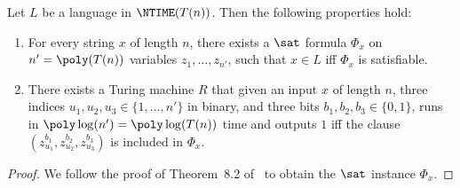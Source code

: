 \begin{theorem}\label{thm:cook-levin}
  Let $L$ be a language in $\NTIME(T(n))$. Then the following
  properties hold:
  \begin{enumerate}
  \item For every string $x$ of length $n$, there exists a $\sat$
    formula $\Phi_x$ on $n' = \poly(T(n))$ variables $z_1, \dots, z_{n'}$, such that $x \in L$ iff
    $\Phi_x$ is satisfiable.
    \item There exists a Turing
      machine $R$ that given an input $x$ of
      length $n$, three indices $u_1, u_2, u_3 \in \{1, \dots, n'\}$ in
      binary, and three bits $b_1, b_2, b_3 \in \{0,1\}$, runs in
      $\poly\log(n') = \poly\log(T(n))$ time and outputs $1$ iff the clause
      $(z_{u_1}^{b_1}, z_{u_2}^{b_2}, z_{u_3}^{b_3})$ is included in $\Phi_x$.
    \end{enumerate}
  \end{theorem}
  \begin{proof}
    We follow the proof of Theorem~8.2 of~\cite{Pap94} to obtain the
    $\sat$ instance $\Phi_x$. 
  \end{proof}

